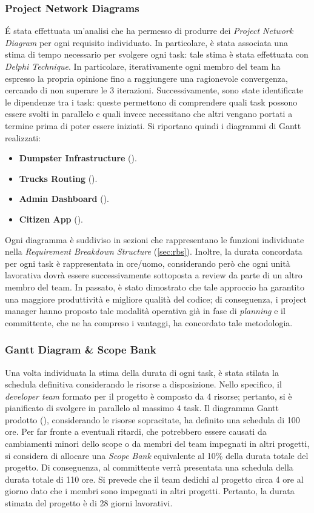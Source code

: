\subsubsection{Project Network Diagrams}
\'E stata effettuata un'analisi che ha permesso di produrre dei \textit{Project Network Diagram} per ogni requisito individuato.
In particolare, è stata associata una stima di tempo necessario per svolgere ogni task: tale stima è stata effettuata con \textit{Delphi Technique}.
In particolare, iterativamente ogni membro del team ha espresso la propria opinione fino a raggiungere una ragionevole convergenza, cercando di non superare le 3 iterazioni.
Successivamente, sono state identificate le dipendenze tra i task: queste permettono di comprendere quali task possono essere svolti in parallelo e quali invece necessitano che altri vengano portati a termine prima di poter essere iniziati.
Si riportano quindi i diagrammi di Gantt realizzati:
\begin{itemize}
    \item \textbf{Dumpster Infrastructure} ().
    \item \textbf{Trucks Routing} ().
    \item \textbf{Admin Dashboard} ().
    \item \textbf{Citizen App} ().
\end{itemize}
Ogni diagramma è suddiviso in sezioni che rappresentano le funzioni individuate nella \textit{Requirement Breakdown Structure} (\ref{sec:rbs}).
Inoltre, la durata concordata per ogni task è rappresentata in ore/uomo, considerando però che ogni unità lavorativa dovrà essere successivamente sottoposta a review da parte di un altro membro del team.
In passato, è stato dimostrato che tale approccio ha garantito una maggiore produttività e migliore qualità del codice; di conseguenza, i project manager hanno proposto tale modalità operativa già in fase di \textit{planning} e il committente, che ne ha compreso i vantaggi, ha concordato tale metodologia.

\subsubsection{Gantt Diagram \& Scope Bank}
Una volta individuata la stima della durata di ogni task, è stata stilata la schedula definitiva considerando le risorse a disposizione.
Nello specifico, il \textit{developer team} formato per il progetto è composto da 4 risorse; pertanto, si è pianificato di svolgere in parallelo al massimo 4 task.
Il diagramma Gantt prodotto (), considerando le risorse sopracitate, ha definito una schedula di 100 ore.
Per far fronte a eventuali ritardi, che potrebbero essere causati da cambiamenti minori dello scope o da membri del team impegnati in altri progetti, si considera di allocare una \textit{Scope Bank} equivalente al 10\% della durata totale del progetto. Di conseguenza, al committente verrà presentata una schedula della durata totale di 110 ore.
Si prevede che il team dedichi al progetto circa 4 ore al giorno dato che i membri sono impegnati in altri progetti.
Pertanto, la durata stimata del progetto è di 28 giorni lavorativi.
